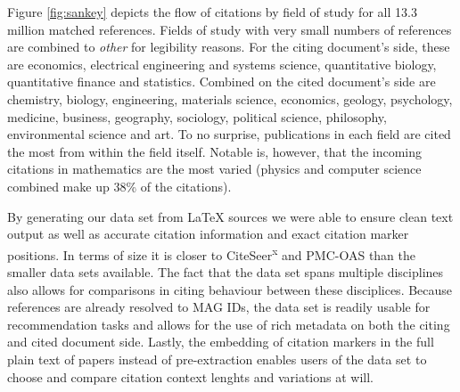 Figure \ref{fig:sankey} depicts the flow of citations by field of study for all 13.3 million matched references. Fields of study with very small numbers of references are combined to \emph{other} for legibility reasons. For the citing document's side, these are economics, electrical engineering and systems science, quantitative biology, quantitative finance and statistics. Combined on the cited document's side are chemistry, biology, engineering, materials science, economics, geology, psychology, medicine, business, geography, sociology, political science, philosophy, environmental science and art. To no surprise, publications in each field are cited the most from within the field itself. Notable is, however, that the incoming citations in mathematics are the most varied (physics and computer science combined make up 38\% of the citations).

By generating our data set from \LaTeX{} sources we were able to ensure clean text output as well as accurate citation information and exact citation marker positions. In terms of size it is closer to CiteSeer\textsuperscript{x} and PMC-OAS than the smaller data sets available. The fact that the data set spans multiple disciplines also allows for comparisons in citing behaviour between these disciplices. Because references are already resolved to MAG IDs, the data set is readily usable for recommendation tasks and allows for the use of rich metadata on both the citing and cited document side. Lastly, the embedding of citation markers in the full plain text of papers instead of pre-extraction enables users of the data set to choose and compare citation context lenghts and variations at will.
